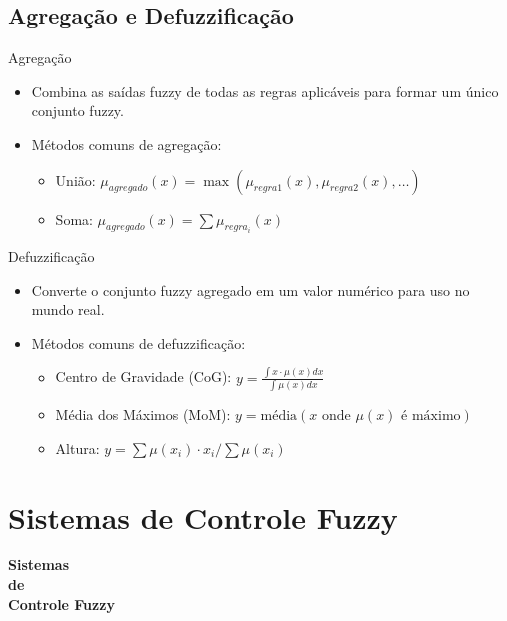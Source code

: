 \documentclass[aspectratio=169]{beamer}
\begin{document}
\subsection{Agregação e Defuzzificação}
\footnotesize
\begin{frame}{}
    \begin{block}{Agregação}
        \begin{itemize}
            \item Combina as saídas fuzzy de todas as regras aplicáveis para formar um único conjunto fuzzy.
            \item Métodos comuns de agregação:
            \begin{itemize}
                \item União: \( \mu_{agregado}(x) = \max(\mu_{regra1}(x), \mu_{regra2}(x), \ldots) \)
                \item Soma: \( \mu_{agregado}(x) = \sum \mu_{regra_i}(x) \)
            \end{itemize}
        \end{itemize}
    \end{block}
    \pause
    \begin{block}{Defuzzificação}
        \begin{itemize}
            \item Converte o conjunto fuzzy agregado em um valor numérico para uso no mundo real.
            \item Métodos comuns de defuzzificação:
            \begin{itemize}
                \item Centro de Gravidade (CoG): \( y = \frac{\int x \cdot \mu(x) dx}{\int \mu(x) dx} \)
                \item Média dos Máximos (MoM): \( y = \text{média}(x \text{ onde } \mu(x) \text{ é máximo}) \)
                \item Altura: \( y = \sum \mu(x_i) \cdot x_i / \sum \mu(x_i) \)
            \end{itemize}
        \end{itemize}
    \end{block}
\end{frame}

\section{Sistemas de Controle Fuzzy}
\begin{frame}
\centering
\Huge
\textbf{Sistemas\\de\\Controle Fuzzy}
\end{frame}
\end{document}
